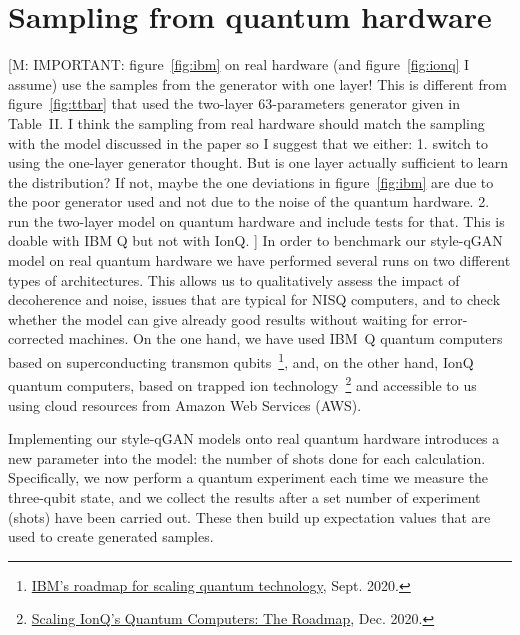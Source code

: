 \documentclass[twocolumn,preprintnumbers,superscriptaddress]{revtex4-2}
\newcommand{\commentMC}[1]{{\color{magenta} {[M: #1]}}}
\begin{document}
\section{Sampling from quantum hardware}
\label{sec:deployment}

\commentMC{IMPORTANT: figure~\ref{fig:ibm} on real hardware (and figure~\ref{fig:ionq} I assume) use the samples from the generator with one layer! This is different from figure~\ref{fig:ttbar} that used the two-layer 63-parameters generator given in Table~II.
I think the sampling from real hardware should match the sampling with the model discussed in the paper so I suggest that we either:
1. switch to using the one-layer generator thought. But is one layer actually sufficient to learn the distribution? If not, maybe the one deviations in figure~\ref{fig:ibm} are due to the poor generator used and not due to the noise of the quantum hardware.
2. run the two-layer model on quantum hardware and include tests for that. This is doable with IBM Q but not with IonQ.
}
In order to benchmark our style-qGAN model on real quantum hardware we
have performed several runs on two different types of
architectures. This allows us to qualitatively assess the impact of
decoherence and noise, issues that are typical for NISQ computers, and
to check whether the model can give already good results without
waiting for error-corrected machines. On the one hand, we have used IBM~Q
quantum computers based on superconducting transmon
qubits~\footnote{\href{https://research.ibm.com/blog/ibm-quantum-roadmap}{IBM's roadmap for scaling quantum technology}, Sept. 2020.}, and, on the other hand, IonQ quantum computers, based on trapped ion technology~\footnote{\href{https://IonQ.com/posts/december-09-2020-scaling-quantum-computer-roadmap}{Scaling IonQ's Quantum Computers: The Roadmap}, Dec. 2020.} and
accessible to us using cloud resources from Amazon Web Services
(AWS).

Implementing our style-qGAN models onto real quantum hardware introduces a new parameter into the model: the number of shots done for each calculation. Specifically,  we now perform a quantum experiment each time we measure the three-qubit state, and we collect the results after a set number of experiment (shots) have been carried out. These then build up expectation values that are used to create generated samples.
\end{document}
